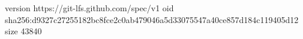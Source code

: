 version https://git-lfs.github.com/spec/v1
oid sha256:d9327c27255182bc8fce2c0ab479046a5d33075547a40ce857d184c119405d12
size 43840
